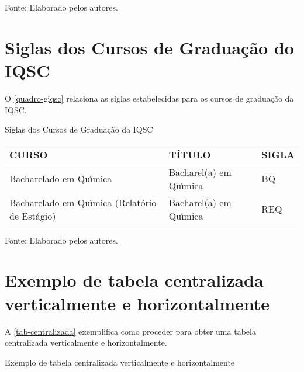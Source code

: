 \begin{apendicesenv}
\begin{quadro}[htb]
\begin{tabular}{|p{6.5cm}|p{6.5cm}|p{1.75cm}|}
	\end{tabular}
	\begin{flushleft}
		Fonte: Elaborado pelos autores.\
	\end{flushleft}
\end{quadro}

\chapter{Siglas dos Cursos de Gradua\c{c}\~ao do IQSC}
O \autoref{quadro-giqsc} relaciona as siglas estabelecidas para os cursos de gradua\c{c}\~ao da IQSC.
\begin{quadro}[htb]
	\ABNTEXfontereduzida
	\caption[Siglas dos Cursos de Gradua\c{c}\~ao da IQSC]{Siglas dos Cursos de Gradua\c{c}\~ao da IQSC}
	\label{quadro-giqsc}
	\begin{tabular}{|p{6.5cm}|p{6.5cm}|p{1.75cm}|}
		\hline
		\textbf{CURSO} & \textbf{T\'ITULO} &  \textbf{SIGLA}  \\
		\hline
		Bacharelado em Qu\'{\i}mica & Bacharel(a) em Qu\'{\i}mica & BQ\\
		Bacharelado em Qu\'{\i}mica (Relat\'orio de Est\'agio)  & Bacharel(a) em Qu\'{\i}mica & REQ\\
		\hline
		
	\end{tabular}
	\begin{flushleft}
		Fonte: Elaborado pelos autores.\
	\end{flushleft}
\end{quadro}

\chapter{Exemplo de tabela centralizada verticalmente e horizontalmente}
\index{tabelas}A \autoref{tab-centralizada} exemplifica como proceder para obter uma tabela centralizada verticalmente e horizontalmente.
\begin{table}[htb]
\ABNTEXfontereduzida
\caption[Exemplo de tabela centralizada verticalmente e horizontalmente]{Exemplo de tabela centralizada verticalmente e horizontalmente}
\label{tab-centralizada}


\end{table}
\end{apendicesenv}
